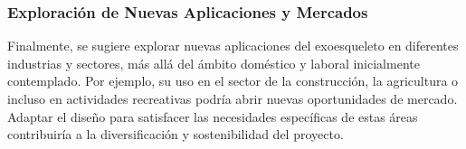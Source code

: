 \subsubsection{Exploración de Nuevas Aplicaciones y Mercados}
Finalmente, se sugiere explorar nuevas aplicaciones del exoesqueleto en diferentes industrias y sectores, más allá del ámbito doméstico y laboral inicialmente contemplado. Por ejemplo, su uso en el sector de la construcción, la agricultura o incluso en actividades recreativas podría abrir nuevas oportunidades de mercado. Adaptar el diseño para satisfacer las necesidades específicas de estas áreas contribuiría a la diversificación y sostenibilidad del proyecto.
